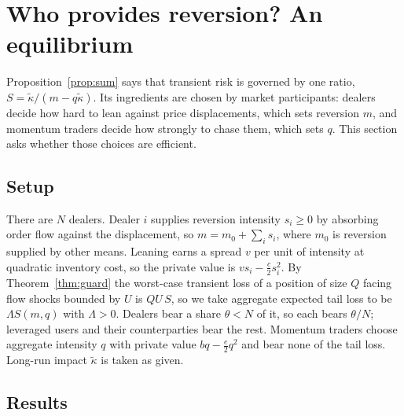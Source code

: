 \documentclass[12pt]{article}
\theoremstyle{definition}
\theoremstyle{remark}
\begin{document}
\section{Who provides reversion? An equilibrium}\label{sec:equil}

Proposition~\ref{prop:sum} says that transient risk is governed by one ratio, $S=\tilde\kappa/(m-q\tilde\kappa)$. Its ingredients are chosen by market participants: dealers decide how hard to lean against price displacements, which sets reversion $m$, and momentum traders decide how strongly to chase them, which sets $q$. This section asks whether those choices are efficient.

\subsection{Setup}
There are $N$ dealers. Dealer $i$ supplies reversion intensity $s_i\ge0$ by absorbing order flow against the displacement, so $m=m_0+\sum_is_i$, where $m_0$ is reversion supplied by other means. Leaning earns a spread $v$ per unit of intensity at quadratic inventory cost, so the private value is $vs_i-\tfrac c2s_i^2$. By Theorem~\ref{thm:guard} the worst-case transient loss of a position of size $Q$ facing flow shocks bounded by $U$ is $QU\,S$, so we take aggregate expected tail loss to be $\Lambda S(m,q)$ with $\Lambda>0$. Dealers bear a share $\theta<N$ of it, so each bears $\theta/N$; leveraged users and their counterparties bear the rest. Momentum traders choose aggregate intensity $q$ with private value $bq-\tfrac e2q^2$ and bear none of the tail loss. Long-run impact $\tilde\kappa$ is taken as given.

\subsection{Results}
\end{document}
